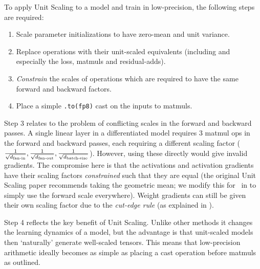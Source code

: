 To apply Unit Scaling to a model and train in low-precision, the following steps are required:

\begin{enumerate}
    \item Scale parameter initializations to have zero-mean and unit variance.
    \item Replace operations with their unit-scaled equivalents (including and especially the loss, matmuls and residual-adds).
    \item \textit{Constrain} the scales of operations which are required to have the same forward and backward factors.
    \item Place a simple \texttt{.to(fp8)} cast on the inputs to matmuls.
\end{enumerate}

Step 3 relates to the problem of conflicting scales in the forward and backward passes. A single linear layer in a differentiated model requires 3 matmul ops in the forward and backward passes, each requiring a different scaling factor ($\frac{1}{\sqrt{d_{\mathrm{fan{\text -}in}}}}, \frac{1}{\sqrt{d_{\mathrm{fan{\text -}out}}}}, \frac{1}{\sqrt{d_{\mathrm{batch{\text -}size}}}}$). However, using these directly would give invalid gradients. The compromise here is that the activations and activation gradients have their scaling factors \textit{constrained} such that they are equal (the original Unit Scaling paper recommends taking the geometric mean; we modify this for \umup\ in  to simply use the forward scale everywhere). Weight gradients can still be given their own scaling factor due to the \textit{cut-edge rule} (as explained in ).

Step 4 reflects the key benefit of Unit Scaling. Unlike other methods it changes the learning dynamics of a model, but the advantage is that unit-scaled models then `naturally' generate well-scaled tensors. This means that low-precision arithmetic ideally becomes as simple as placing a cast operation before matmuls as outlined.
